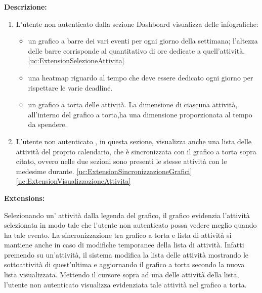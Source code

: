 \begin{listaPersonale}[UC]{}
    \textbf{Descrizione:}
    \begin{enumerate}
        \item L'utente non autenticato dalla sezione Dashboard visualizza delle infografiche:
              \begin{itemize}
                  \item un grafico a barre dei vari eventi per ogni giorno della settimana; l'altezza delle barre corrisponde al quantitativo di ore dedicate a quell'attività. \ref{uc:ExtensionSelezioneAttivita}
                  \item una heatmap riguardo al tempo che deve essere dedicato ogni giorno per rispettare le varie deadline.
                  \item un grafico a torta delle attività. La dimensione di ciascuna attività, all'interno del grafico a torta,ha una dimensione proporzionata al tempo da spendere.
              \end{itemize}
        \item L'utente non autenticato , in questa sezione, visualizza anche una lista delle attività del proprio calendario, che è sincronizzata con il grafico a torta sopra citato, ovvero nelle due sezioni sono presenti le stesse attività con le medesime durante. \ref{uc:ExtensionSincronizzazioneGrafici} \ref{uc:ExtensionVisualizzazioneAttivita}
    \end{enumerate}

    \textbf{Extensions:}
    \begin{enumerate}[label=\textbf{[extension \arabic{enumii}]}, ref= \textbf{[extension \arabic{enumii}]}]
         Selezionando un' attività dalla legenda del grafico, il grafico evidenzia l'attività selezionata in modo tale che l'utente non autenticato possa vedere meglio quando ha tale evento.
         La sincronizzazione tra grafico a torta e lista di attività si mantiene anche in caso di modifiche temporanee della lista di attività. Infatti premendo su un'attività, il sistema modifica la lista delle attività mostrando le sottoattività di quest'ultima e aggiornando il grafico a torta secondo la nuova lista visualizzata.
         Mettendo il cursore sopra ad una delle attività della lista, l'utente non autenticato visualizza evidenziata tale attività nel grafico a torta.
    \end{enumerate}




\end{listaPersonale}
